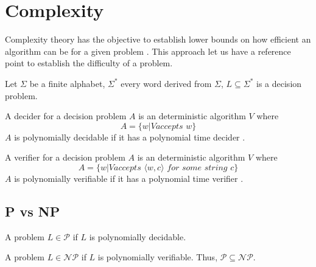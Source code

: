 \section{Complexity}
\label{sec:complex}

Complexity theory has the objective to establish lower bounds on how efficient
an algorithm can be for a given problem \cite{sipserIntroductionTheoryComputation2006}. This approach let us
have a reference point to establish the difficulty of a problem.


\begin{defn}
Let $\Sigma$ be a finite alphabet, $\Sigma^*$ every word derived from $\Sigma$, $L \subseteq \Sigma^*$ is a decision problem.
\end{defn}

\begin{defn}
  A decider for a decision problem $A$ is an deterministic algorithm $V$ where
    $$A = \{w | V \textit{accepts } w\}$$
  $A$ is polynomially decidable if it has a polynomial time decider \cite{sipserIntroductionTheoryComputation2006}.
\end{defn}

\begin{defn}
A verifier for a decision problem $A$ is an deterministic algorithm $V$ where
  $$A = \{w | V \textit{accepts } \langle w,c\rangle \textit{ for some string } c\}$$
$A$ is polynomially verifiable if it has a polynomial time verifier \cite{sipserIntroductionTheoryComputation2006}.
\end{defn}

\subsection{P vs NP}

\begin{defn}
A problem $L \in \mathcal{P}$ if $L$ is polynomially decidable.
\end{defn}

\begin{defn}
A problem $L \in \mathcal{NP}$ if $L$ is polynomially verifiable. Thus, $\mathcal{P} \subseteq \mathcal{NP}$.
\end{defn}

